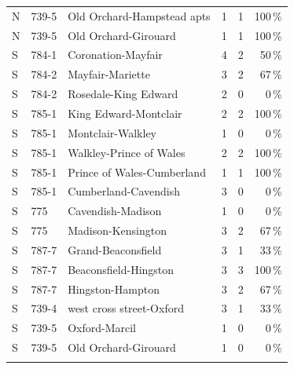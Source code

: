 \documentclass[11pt]{article}
\begin{document}
\begin{longtable}{llp{5.2cm}rrr}
N & 739-5 & Old Orchard-Hampstead apts & 1 & 1 & 100\,\% \\
N & 739-5 & Old Orchard-Girouard & 1 & 1 & 100\,\% \\
S & 784-1 & Coronation-Mayfair & 4 & 2 & 50\,\% \\
S & 784-2 & Mayfair-Mariette & 3 & 2 & 67\,\% \\
S & 784-2 & Rosedale-King Edward & 2 & 0 & 0\,\% \\
S & 785-1 & King Edward-Montclair & 2 & 2 & 100\,\% \\
S & 785-1 & Montclair-Walkley & 1 & 0 & 0\,\% \\
S & 785-1 & Walkley-Prince of Wales & 2 & 2 & 100\,\% \\
S & 785-1 & Prince of Wales-Cumberland & 1 & 1 & 100\,\% \\
S & 785-1 & Cumberland-Cavendish & 3 & 0 & 0\,\% \\
S & 775 & Cavendish-Madison & 1 & 0 & 0\,\% \\
S & 775 & Madison-Kensington & 3 & 2 & 67\,\% \\
S & 787-7 & Grand-Beaconsfield & 3 & 1 & 33\,\% \\
S & 787-7 & Beaconsfield-Hingston & 3 & 3 & 100\,\% \\
S & 787-7 & Hingston-Hampton & 3 & 2 & 67\,\% \\
S & 739-4 & west cross street-Oxford & 3 & 1 & 33\,\% \\
S & 739-5 & Oxford-Marcil & 1 & 0 & 0\,\% \\
S & 739-5 & Old Orchard-Girouard & 1 & 0 & 0\,\% \\
\\\bottomrule\end{longtable}
\end{document}
